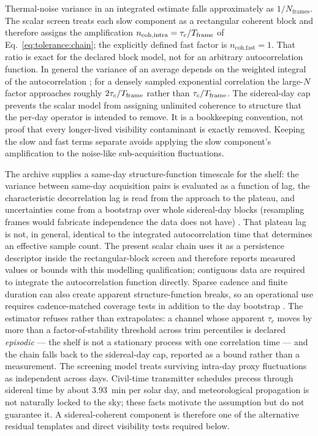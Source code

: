 Thermal-noise variance in an integrated estimate falls approximately as $1/N_{\text{frames}}$.  The scalar screen treats each slow component as a rectangular coherent block and therefore assigns the amplification $n_{\text{coh,intra}}=\tau_c/T_{\rm frame}$ of Eq.~\eqref{eq:tolerance:chain}; the explicitly defined fast factor is $n_{\text{coh,fast}}=1$.  That ratio is exact for the declared block model, not for an arbitrary autocorrelation function.  In general the variance of an average depends on the weighted integral of the autocorrelation \cite{bartlett1946,geyer1992}; for a densely sampled exponential correlation the large-$N$ factor approaches roughly $2\tau_c/T_{\rm frame}$ rather than $\tau_c/T_{\rm frame}$.  The sidereal-day cap prevents the scalar model from assigning unlimited coherence to structure that the per-day operator is intended to remove.  It is a bookkeeping convention, not proof that every longer-lived visibility contaminant is exactly removed.  Keeping the slow and fast terms separate avoids applying the slow component's amplification to the noise-like sub-acquisition fluctuations.

The archive supplies a same-day structure-function timescale for the shelf: the variance between same-day acquisition pairs is evaluated as a function of lag, the characteristic decorrelation lag is read from the approach to the plateau, and uncertainties come from a bootstrap over whole sidereal-day blocks (resampling frames would fabricate independence the data does not have) \cite{kunsch1989}.  That plateau lag is not, in general, identical to the integrated autocorrelation time that determines an effective sample count.  The present scalar chain uses it as a persistence descriptor inside the rectangular-block screen and therefore reports measured values or bounds with this modelling qualification; contiguous data are required to integrate the autocorrelation function directly.  Sparse cadence and finite duration can also create apparent structure-function breaks, so an operational use requires cadence-matched coverage tests in addition to the day bootstrap \cite{emmanoulopoulos2010}. The estimator refuses rather than extrapolates: a channel whose apparent $\tau_c$ moves by more than a factor-of-stability threshold across trim percentiles is declared \emph{episodic} --- the shelf is not a stationary process with one correlation time --- and the chain falls back to the sidereal-day cap, reported as a bound rather than a measurement. The screening model treats surviving intra-day proxy fluctuations as independent across days.  Civil-time transmitter schedules precess through sidereal time by about 3.93~min per solar day, and meteorological propagation is not naturally locked to the sky; these facts motivate the assumption but do not guarantee it.  A sidereal-coherent component is therefore one of the alternative residual templates and direct visibility tests required below.

